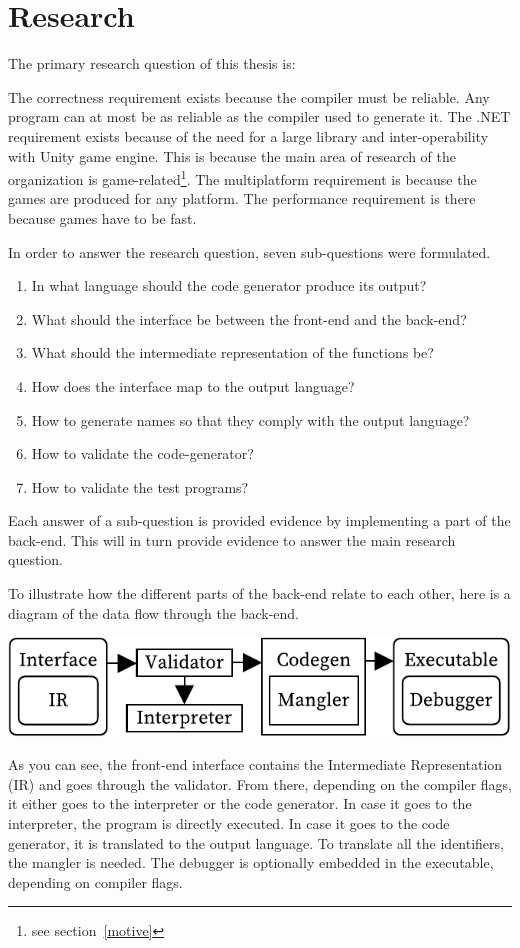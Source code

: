 \section{Research}\label{research}

The primary research question of this thesis is:



The correctness requirement exists because the compiler must be reliable.
Any program can at most be as reliable as the compiler used to generate it.
\label{whydotnet}
The .NET requirement exists because of the need for a large library and inter-operability with Unity game engine.
This is because the main area of research of the organization is game-related\footnote{see section~\ref{motive}}.
The multiplatform requirement is because the games are produced for any platform.
The performance requirement is there because games have to be fast.

In order to answer the research question, seven sub-questions were formulated.

\begin{enumerate}
    \item In what language should the code generator produce its output?
    \item What should the interface be between the front-end and the back-end?
    \item What should the intermediate representation of the functions be?
    \item How does the interface map to the output language?
    \item How to generate names so that they comply with the output language?
    \item How to validate the code-generator?
    \item How to validate the test programs?
\end{enumerate}

Each answer of a sub-question is provided evidence by implementing a part of the back-end. 
This will in turn provide evidence to answer the main research question.

To illustrate how the different parts of the back-end relate to each other, here is a diagram of the data flow through the back-end.

\includegraphics[width=\columnwidth]{overview}

As you can see, the front-end interface contains the Intermediate Representation (IR) and goes through the validator.
From there, depending on the compiler flags, it either goes to the interpreter or the code generator.
In case it goes to the interpreter, the program is directly executed.
In case it goes to the code generator, it is translated to the output language.
To translate all the identifiers, the mangler is needed.
The debugger is optionally embedded in the executable, depending on compiler flags.

